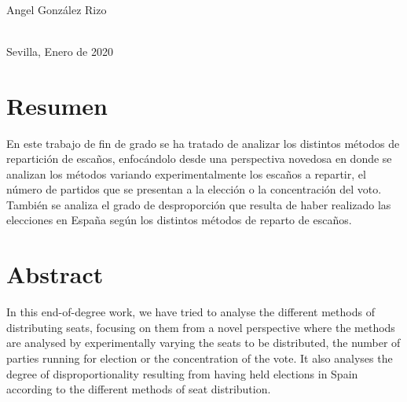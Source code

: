 \documentclass[12pt,a4paper,]{book}
\def\ifdoblecara{} %
\numberwithin{dummy}{section}
\theoremstyle{ocrenumbox}
\theoremstyle{blacknumex}
\theoremstyle{blacknumbox}
\theoremstyle{ocrenum}
\theoremstyle{ocrenum}
\begin{document}
\begin{titlepage}
\begin{minipage}{14cm}
\HRule \\[4cm]


{\Large

Angel González Rizo} \\[0.5cm]

{\large
Sevilla, Enero de 2020
}

\end{minipage}

\vfill %

\cleardoublepage
\thispagestyle{empty}
\end{titlepage}

\raggedbottom


\setlength{\parindent}{1em}

\pagestyle{fancy}
\ifdefined\ifdoblecara
\fancyhead[LE,RO]{}
\fancyhead[LO,RE]{}
\else
\fancyhead[RO]{}
\fancyhead[LO]{}
\fi
\renewcommand{\headrulewidth}{0pt}
\renewcommand{\footrulewidth}{0pt}

\setcounter{tocdepth}{2}
\tableofcontents

\cleardoublepage

\section*{Resumen}

En este trabajo de fin de grado se ha tratado de analizar los distintos
métodos de repartición de escaños, enfocándolo desde una perspectiva
novedosa en donde se analizan los métodos variando experimentalmente los
escaños a repartir, el número de partidos que se presentan a la elección
o la concentración del voto. También se analiza el grado de
desproporción que resulta de haber realizado las elecciones en España
según los distintos métodos de reparto de escaños.

\clearpage
\section*{Abstract}

In this end-of-degree work, we have tried to analyse the different
methods of distributing seats, focusing on them from a novel perspective
where the methods are analysed by experimentally varying the seats to be
distributed, the number of parties running for election or the
concentration of the vote. It also analyses the degree of
disproportionality resulting from having held elections in Spain
according to the different methods of seat distribution.
\end{document}
